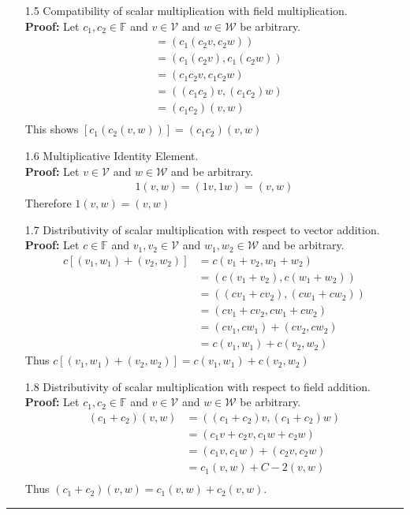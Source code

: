 \documentclass[12pt]{amsart}
\newcommand{\1}{\mathbbm{1}}
\numberwithin{equation}{section}
\numberwithin{Theorem}{section}
\theoremstyle{plain} %
\theoremstyle{definition}
\theoremstyle{remark}
\begin{document}
\begin{enumerate}[1.]
\begin{itemize}
	\item[1.5]  Compatibility of scalar multiplication with field multiplication. \\
	\textbf{Proof:}
	Let $c_1, c_2 \in\mathbb{F}$
	and $v \in \mathcal{V}$ and $w \in \mathcal{W}$ be arbitrary.
	\begin{align*}
		[c_1(c_2(v,w))]
		&= (c_1(c_2v,c_2w)) \\
		&= (c_1(c_2v),c_1(c_2w)) \\
		&= (c_1c_2v,c_1c_2w) \\
		&= ((c_1c_2)v,(c_1c_2)w) \\
		&= (c_1c_2)(v,w) \\
	\end{align*}
	This shows $[c_1(c_2(v,w))] = (c_1c_2)(v,w)$ \\
	
	\item[1.6]  Multiplicative Identity Element. \\
	\textbf{Proof:}
	Let $v \in \mathcal{V}$ and $w \in \mathcal{W}$ and be arbitrary.
	\begin{align*}
		1(v,w) = (1v,1w) = (v,w) 
	\end{align*}
	Therefore $1(v,w) = (v,w)$ \\
	
	\item[1.7]  Distributivity of scalar multiplication with respect to vector addition. \\
	\textbf{Proof:}
	Let $c \in\mathbb{F}$
	and $v_1,v_2 \in \mathcal{V}$ and $w_1,w_2 \in \mathcal{W}$ and be arbitrary. 
	\begin{align*}
		c[(v_1,w_1)+(v_2,w_2)]
		&= c(v_1+v_2,w_1+w_2) \\
		&= (c(v_1+v_2),c(w_1+w_2)) \\
		&= ((cv_1+cv_2),(cw_1+cw_2)) \\
		&= (cv_1+cv_2,cw_1+cw_2) \\
		&= (cv_1,cw_1) + (cv_2,cw_2) \\
		&= c(v_1,w_1) + c(v_2,w_2)
	\end{align*}
	Thus $c[(v_1,w_1)+(v_2,w_2)] = c(v_1,w_1) + c(v_2,w_2)$ \\
	
	\item[1.8]  Distributivity of scalar multiplication with respect to field addition. \\
	\textbf{Proof:}
	Let $c_1, c_2 \in\mathbb{F}$
	and $v \in \mathcal{V}$ and $w \in \mathcal{W}$ be arbitrary. 
	\begin{align*}
		(c_1+c_2)(v,w)
		&= ((c_1+c_2)v,(c_1+c_2)w) \\
		&= (c_1v+c_2v,c_1w+c_2w) \\
		&= (c_1v,c_1w)+(c_2v,c_2w) \\
		&= c_1(v,w)+C-2(v,w) \\
	\end{align*}
	Thus $(c_1+c_2)(v,w) = c_1(v,w)+c_2(v,w)$. \\
	
	
\end{itemize}


\end{enumerate}
\bigskip\hrule\bigskip
\end{document}
